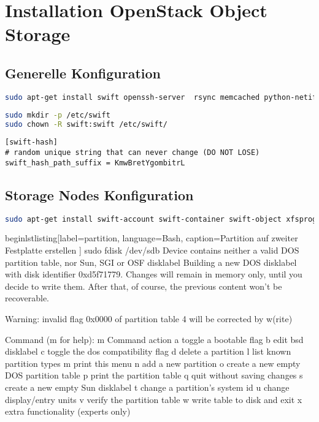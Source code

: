 \cleardoublepage
\chapter{Installation OpenStack Object Storage}
\section{Generelle Konfiguration}

\begin{lstlisting}[label=paketegenerell, language=Bash, caption=Installation generelle Host Pakete ]
sudo apt-get install swift openssh-server  rsync memcached python-netifaces python-xattr python-memcache 
\end{lstlisting}

\begin{lstlisting}[label=swiftconfdir, language=Bash, caption=Erstell /etc/swift Ordner und setzt Berechtigung ]
sudo mkdir -p /etc/swift
sudo chown -R swift:swift /etc/swift/
\end{lstlisting}


\begin{lstlisting}[label=swift.conf language=Bash, caption=Swift in /etc/swift/swift.conf konfigurieren]
[swift-hash]
# random unique string that can never change (DO NOT LOSE)
swift_hash_path_suffix = KmwBretYgombitrL
\end{lstlisting}

\section{Storage Nodes Konfiguration}

\begin{lstlisting}[label=paketenode, language=Bash, caption=Installation Data-Node Pakete ]
sudo apt-get install swift-account swift-container swift-object xfsprogs
\end{lstlisting}

begin{lstlisting}[label=partition, language=Bash, caption=Partition auf zweiter Festplatte erstellen ]
sudo fdisk /dev/sdb 
Device contains neither a valid DOS partition table, nor Sun, SGI or OSF disklabel
Building a new DOS disklabel with disk identifier 0xd5f71779.
Changes will remain in memory only, until you decide to write them.
After that, of course, the previous content won't be recoverable.

Warning: invalid flag 0x0000 of partition table 4 will be corrected by w(rite)

Command (m for help): m
Command action
   a   toggle a bootable flag
   b   edit bsd disklabel
   c   toggle the dos compatibility flag
   d   delete a partition
   l   list known partition types
   m   print this menu
   n   add a new partition
   o   create a new empty DOS partition table
   p   print the partition table
   q   quit without saving changes
   s   create a new empty Sun disklabel
   t   change a partition's system id
   u   change display/entry units
   v   verify the partition table
   w   write table to disk and exit
   x   extra functionality (experts only)

